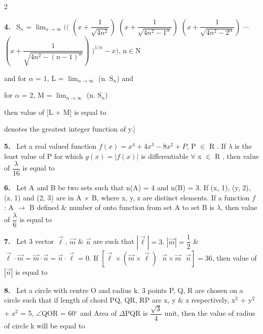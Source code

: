 \documentclass[10pt]{extarticle}
\newcommand{\qn}[1]{\par\smallskip\noindent\textbf{#1.}~}
\begin{document}
\begin{multicols}{2}
\qn{4} S$_n$ = $\displaystyle\lim_{x \to \infty}\bigl(\bigl($ $\left(x + \dfrac{1}{\sqrt{4n^2}}\right)$ $\left(x + \dfrac{1}{\sqrt{4n^2 - 1^\alpha}}\right)$ $\left(x + \dfrac{1}{\sqrt{4n^2 - 2^\alpha}}\right)$ $\cdots$ $\left(x + \dfrac{1}{\sqrt{4n^2 - (n-1)^\alpha}}\right)$ $\bigr)^{1/n} - x\bigr)$, n$\in$N\par
and for $\alpha$ = 1, L = $\displaystyle\lim_{n \to \infty}$ (n. S$_n$) and\par
for $\alpha$ = 2, M = $\displaystyle\lim_{n \to \infty}$ (n. S$_n$)\par
then value of [L + M] is equal to\par
[Note : [y] denotes the greatest integer function of y.]
\qn{5} Let a real valued function $f(x) = x^4 + 4x^3 - 8x^2 + P$, P $\in$ R . If $\lambda$ is the least value of P for which $g(x) = |f(x)|$ is differentiable $\forall$ x $\in$ R , then value of $\dfrac{\lambda}{16}$ is equal to
\qn{6} Let A and B be two sets such that n(A) = 4 and n(B) = 3. If (x, 1), (y, 2), (z, 1) and (2, 3) are in A $\times$ B, where x, y, z are distinct elements. If a function $f$ : A $\to$ B defined \& number of onto function from set A to set B is $\lambda$, then value of $\dfrac{\lambda}{6}$ is equal to
\qn{7} Let 3 vector $\vec{\ell}$, $\vec{m}$ \& $\vec{n}$ are such that $\left|\vec{\ell}\right| = 3$, $\left|\vec{m}\right| = \dfrac{1}{2}$ \& $\vec{\ell}\cdot\vec{m} = \vec{m}\cdot\vec{n} = \vec{n}\cdot\vec{\ell} = 0$. If $\left[\vec{\ell}\times\left(\vec{m}\times\vec{\ell}\right)\ \ \ \vec{n}\times\vec{m}\ \ \ \vec{n}\right] = 36$, then value of $\left|\vec{n}\right|$ is equal to
\qn{8} Let a circle with centre O and radius k. 3 points P, Q, R are chosen on a circle such that if length of chord PQ, QR, RP are x, y \& z respectively, x$^2$ + y$^2$ + z$^2$ = 5, $\angle$QOR = 60$^\circ$ and Area of $\Delta$PQR is $\dfrac{\sqrt{3}}{4}$ unit, then the value of radius of circle k will be equal to
\end{multicols}
\end{document}
